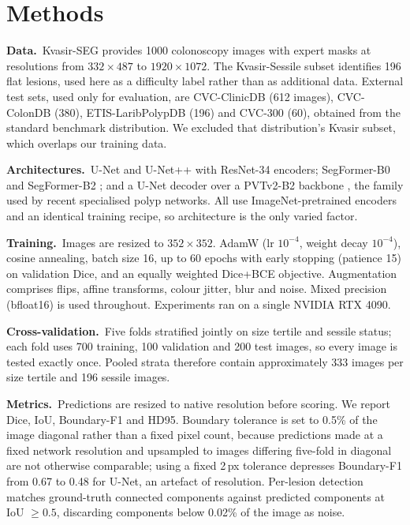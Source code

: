 \documentclass[journal]{IEEEtran}
\begin{document}
\section{Methods}

\smallskip\noindent\textbf{Data.}\  Kvasir-SEG \cite{jha2020kvasirseg} provides 1000
colonoscopy images with expert masks at resolutions from $332\times487$ to
$1920\times1072$. The Kvasir-Sessile subset identifies 196 flat lesions,
used here as a difficulty label rather than as additional data. External
test sets, used only for evaluation, are CVC-ClinicDB
\cite{bernal2015} (612 images), CVC-ColonDB (380), ETIS-LaribPolypDB (196)
and CVC-300 (60), obtained from the standard benchmark distribution. We
excluded that distribution's Kvasir subset, which overlaps our training data.

\smallskip\noindent\textbf{Architectures.}\  U-Net \cite{ronneberger2015} and U-Net++
\cite{zhou2018} with ResNet-34 encoders; SegFormer-B0 and SegFormer-B2
\cite{xie2021segformer}; and a U-Net decoder over a PVTv2-B2 backbone
\cite{wang2022pvtv2}, the family used by recent specialised polyp networks.
All use ImageNet-pretrained encoders and an identical training recipe, so
architecture is the only varied factor.

\smallskip\noindent\textbf{Training.}\  Images are resized to $352\times352$. AdamW
(lr $10^{-4}$, weight decay $10^{-4}$), cosine annealing, batch size 16, up
to 60 epochs with early stopping (patience 15) on validation Dice, and an
equally weighted Dice+BCE objective. Augmentation comprises flips, affine
transforms, colour jitter, blur and noise. Mixed precision (bfloat16) is used
throughout. Experiments ran on a single NVIDIA RTX 4090.

\smallskip\noindent\textbf{Cross-validation.}\  Five folds stratified jointly on size tertile
and sessile status; each fold uses 700 training, 100 validation and 200 test
images, so every image is tested exactly once. Pooled strata therefore
contain approximately 333 images per size tertile and 196 sessile images.

\smallskip\noindent\textbf{Metrics.}\  Predictions are resized to native resolution before
scoring. We report Dice, IoU, Boundary-F1 and HD95. Boundary tolerance is set
to 0.5\% of the image diagonal rather than a fixed pixel count, because
predictions made at a fixed network resolution and upsampled to images
differing five-fold in diagonal are not otherwise comparable; using a fixed
2\,px tolerance depresses Boundary-F1 from 0.67 to 0.48 for U-Net, an
artefact of resolution. Per-lesion detection matches ground-truth connected
components against predicted components at IoU $\geq 0.5$, discarding
components below 0.02\% of the image as noise.
\end{document}
